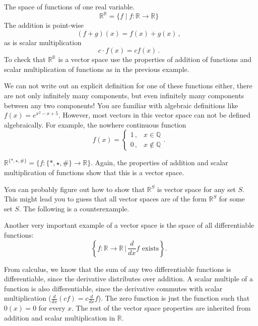 \begin{example} The space of functions of one real variable.\\
\[ \mathbb{R}^{\mathbb{R}} = \{f \mid f \colon \mathbb{R} \to \mathbb{R} \} \]
The addition is point-wise \[(f+g)(x)=f(x)+g(x)\, ,\] as is scalar multiplication \[c\cdot f(x)=cf(x)\, .\]  
To check that $\mathbb{R}^{\mathbb{R}}$ is a vector space use the properties of addition of functions and scalar multiplication of functions as in the previous example. 


We can not write out an explicit definition for one of these functions either, there are not only infinitely many components, but even infinitely many components between any two components!  
You are familiar with algebraic definitions like $f(x)=e^{x^2-x+5}$. However, most vectors in this vector space can not be defined algebraically. For example, the nowhere continuous function 
\begin{displaymath}
   f(x) = \left\{
     \begin{array}{lr}
       1\, , & x \in \mathbb{Q}\\[2mm]
       0\, , &  x \notin \mathbb{Q}
     \end{array}
   \right. .
\end{displaymath} 
\end{example}

\begin{example} $\mathbb{R}^{ \{*, \star, \# \}} = \{ f : \{*, \star, \# \} \to \mathbb{R} \}$. Again, the properties of addition and scalar multiplication of functions show that this is a vector space.
\end{example}

You can probably figure out how to show that $\mathbb{R}^S$ is vector space for any set $S$.  
This might lead you to guess that all vector spaces are of the form $\mathbb{R}^S$ for some set $S$. The following is a counterexample. 

\begin{example}
Another very important example of a vector space is the space of all differentiable functions: 
\[
\left\{ f \colon \mathbb{R}\rightarrow \mathbb{R} \, \Big|\, \frac{d}{dx}f \text{ exists} \right\}.
\]

From calculus, we know that the sum of any two differentiable functions is differentiable, since the derivative distributes over addition.  A scalar multiple of a function is also differentiable, since the derivative commutes with scalar multiplication ($\frac{d}{d x}(cf)=c\frac{d}{dx}f$).  The zero function is just the function such that $0(x)=0$ for every $x$.  The rest of the vector space properties are inherited from addition and scalar multiplication in $\mathbb{R}$.
\end{example}

